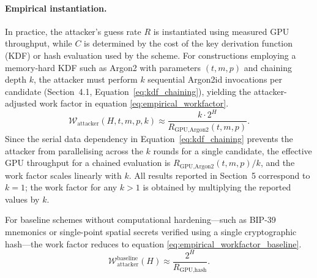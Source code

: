 \documentclass[journal,article,submit,pdftex,moreauthors]{Definitions/mdpi}
\newcommand{\add}[1]{#1}
\newcommand{\add}[1]{\added{#1}}
\begin{document}
\paragraph{Empirical instantiation.}
In practice, the attacker’s guess rate $R$ is instantiated using measured GPU throughput, while $C$ is determined by the cost of the key derivation function (KDF) or hash evaluation used by the scheme. For constructions employing a memory-hard KDF such as Argon2 with parameters $(t, m, p)$ and chaining depth $k$, the attacker must perform $k$ sequential Argon2id invocations per candidate (Section~4.1, Equation~\ref{eq:kdf_chaining}), yielding the attacker-adjusted work factor in equation \ref{eq:empirical_workfactor}.
\begin{equation}
\mathcal{W}_{\text{attacker}}(H, t, m, p, k) \approx \frac{k \cdot 2^{H}}{R_{\text{GPU,Argon2}}(t, m, p)}.
\label{eq:empirical_workfactor}
\end{equation}
\add{Since the serial data dependency in Equation~\ref{eq:kdf_chaining} prevents the attacker from parallelising across the $k$ rounds for a single candidate, the effective GPU throughput for a chained evaluation is $R_{\text{GPU,Argon2}}(t,m,p)/k$, and the work factor scales linearly with $k$. All results reported in Section~5 correspond to $k=1$; the work factor for any $k > 1$ is obtained by multiplying the reported values by $k$.}

For baseline schemes without computational hardening—such as BIP-39 mnemonics or single-point spatial secrets verified using a single cryptographic hash—the work factor reduces to equation \ref{eq:empirical_workfactor_baseline}.
\begin{equation}
\mathcal{W}_{\text{attacker}}^{\text{baseline}}(H) \approx \frac{2^{H}}{R_{\text{GPU,hash}}}.
\label{eq:empirical_workfactor_baseline}
\end{equation}
\end{document}
